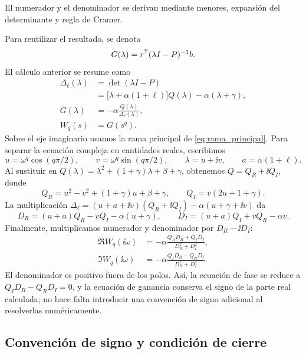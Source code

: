El numerador y el denominador se derivan mediante menores, expansión del
determinante y regla de Cramer.
\begingroup
\def\HAFOderivationpart{2}

\endgroup
Para reutilizar el resultado, se denota
\[
G(\lambda)=r^{\mathsf T}(\lambda I-P)^{-1}b.
\]
El cálculo anterior se resume como
\begin{equation}
\begin{aligned}
\Delta_\ell(\lambda)
&=\det(\lambda I-P)\\
&=\bigl[\lambda+\alpha(1+\ell)\bigr]Q(\lambda)
  -\alpha(\lambda+\gamma),\\
G(\lambda)&=-\alpha\frac{Q(\lambda)}{\Delta_\ell(\lambda)},\\
W_q(s)&=G(s^q).
\end{aligned}
\label{eq:transferencia_explicita}
\end{equation}
Sobre el eje imaginario usamos la rama principal de
\cref{eq:rama_principal}. Para separar la ecuación compleja en cantidades
reales, escribimos
\[
 u=\omega^q\cos(q\pi/2),\qquad v=\omega^q\sin(q\pi/2),
 \qquad \lambda=u+\ii v,
 \qquad a=\alpha(1+\ell).
\]
Al sustituir en \(Q(\lambda)=\lambda^2+(1+\gamma)\lambda+\beta+\gamma\),
obtenemos \(Q=Q_R+\ii Q_I\), donde
\[
 Q_R=u^2-v^2+(1+\gamma)u+\beta+\gamma,
 \qquad Q_I=v(2u+1+\gamma).
\]
La multiplicación \(\Delta_\ell=(u+a+\ii v)(Q_R+\ii Q_I)
-\alpha(u+\gamma+\ii v)\) da
\[
 D_R=(u+a)Q_R-vQ_I-\alpha(u+\gamma),\qquad
 D_I=(u+a)Q_I+vQ_R-\alpha v.
\]
Finalmente, multiplicamos numerador y denominador por
\(D_R-\ii D_I\):
\begin{equation}
 \begin{aligned}
 \Re W_q(\ii\omega)
 &=-\alpha\frac{Q_RD_R+Q_ID_I}{D_R^2+D_I^2},\\
 \Im W_q(\ii\omega)
 &=-\alpha\frac{Q_ID_R-Q_RD_I}{D_R^2+D_I^2}.
 \end{aligned}
 \label{eq:transferencia-partes-reales-explicitas}
\end{equation}
El denominador es positivo fuera de los polos. Así, la ecuación de fase se
reduce a \(Q_ID_R-Q_RD_I=0\), y la ecuación de ganancia conserva el signo
de la parte real calculada; no hace falta introducir una convención de signo
adicional al resolverlas numéricamente.

\subsection{Convención de signo y condición de cierre}

